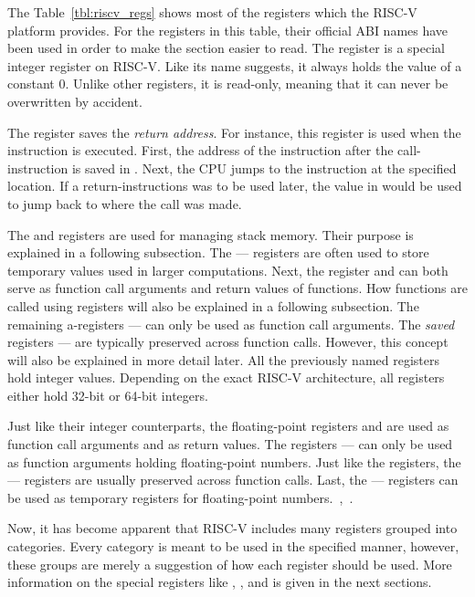 The Table~\ref{tbl:riscv_regs} shows most of the registers which the RISC-V platform provides.
For the registers in this table, their official ABI names have been used in order to make the section easier to read.
The  register is a special integer register on RISC-V.
Like its name suggests, it always holds the value of a constant 0.
Unlike other registers, it is read-only, meaning that it can never be overwritten by accident.

The  register saves the \emph{return address}.
For instance, this register is used when the  instruction is executed.
First, the address of the instruction after the call-instruction is saved in .
Next, the CPU jumps to the instruction at the specified location.
If a return-instructions was to be used later, the value in  would be used to jump back to where the call was made.

The  and  registers are used for managing stack memory.
Their purpose is explained in a following subsection.
The  —  registers are often used to store temporary values used in larger computations.
Next, the register  and  can both serve as function call arguments and return values of functions.
How functions are called using registers will also be explained in a following subsection.
The remaining a-registers  —  can only be used as function call arguments.
The \emph{saved} registers  —  are typically preserved across function calls.
However, this concept will also be explained in more detail later.
All the previously named registers hold integer values.
Depending on the exact RISC-V architecture, all registers either hold 32-bit or 64-bit integers.

Just like their integer counterparts, the floating-point registers  and  are used as function call arguments and as return values.
The registers  —  can only be used as function arguments holding floating-point numbers.
Just like the  registers, the  —  registers are usually preserved across function calls.
Last, the  —  registers can be used as temporary registers for floating-point numbers.~\cite[pp.~18f,p.~34]{Patterson2017},~\cite[p~.155]{Waterman2019}.

Now, it has become apparent that RISC-V includes many registers grouped into categories.
Every category is meant to be used in the specified manner, however, these groups are merely a suggestion of how each register should be used.
More information on the special registers like , , and  is given in the next sections.

